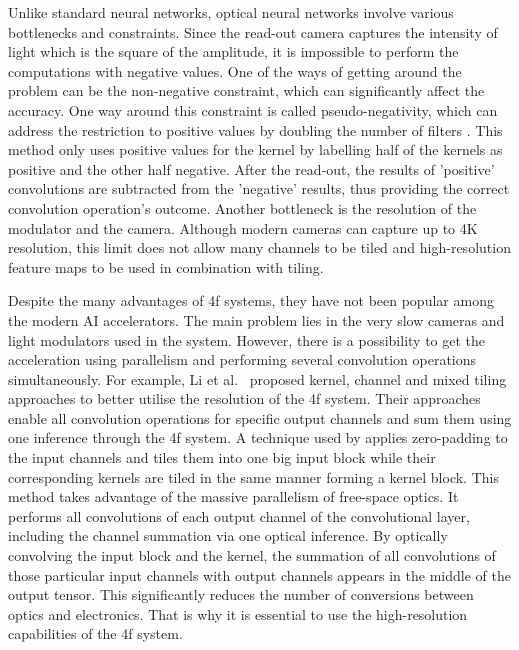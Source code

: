 \documentclass{article}
\begin{document}
Unlike standard neural networks, optical neural networks involve various bottlenecks and constraints. Since the read-out camera captures the intensity of light which is the square of the amplitude, it is impossible to perform the computations with negative values. One of the ways of getting around the problem can be the non-negative constraint, which can significantly affect the accuracy. One way around this constraint is called pseudo-negativity, which can address the restriction to positive values by doubling the number of filters  \cite{chang_hybrid_2018}. This method only uses positive values for the kernel by labelling half of the kernels as positive and the other half negative. After the read-out, the results of 'positive' convolutions are subtracted from the 'negative' results, thus providing the correct convolution operation's outcome. Another bottleneck is the resolution of the modulator and the camera. Although modern cameras can capture up to 4K resolution, this limit does not allow many channels to be tiled and high-resolution feature maps to be used in combination with tiling. 

Despite the many advantages of 4f systems, they have not been popular among the modern AI accelerators. The main problem lies in the very slow cameras and light modulators used in the system. However, there is a possibility to get the acceleration using parallelism and performing several convolution operations simultaneously. For example, Li et al.~\cite{li_channel_2020}  proposed kernel, channel and mixed tiling approaches to better utilise the resolution of the 4f system. Their approaches enable all convolution operations for specific output channels and sum them using one inference through the 4f system. A technique used by \cite{li_channel_2020} applies zero-padding to the input channels and tiles them into one big input block while their corresponding kernels are tiled in the same manner forming a kernel block. This method takes advantage of the massive parallelism of free-space optics. It performs all convolutions of each output channel of the convolutional layer, including the channel summation via one optical inference. By optically convolving the input block and the kernel, the summation of all convolutions of those particular input channels with output channels appears in the middle of the output tensor. This significantly reduces the number of conversions between optics and electronics. That is why it is essential to use the high-resolution capabilities of the 4f system. 
\end{document}
